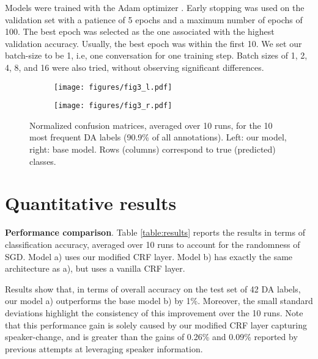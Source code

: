 \documentclass[11pt,a4paper]{article}
\begin{document}
Models were trained with the Adam optimizer \citep{kingma2014adam}.
Early stopping was used on the validation set with a patience of 5 epochs and a maximum number of epochs of 100.
The best epoch was selected as the one associated with the highest validation accuracy. 
Usually, the best epoch was within the first 10.
We set our batch-size to be 1, i.e, one conversation for one training step.
Batch sizes of 1, 2, 4, 8, and 16 were also tried, without observing significant differences.

\begin{figure*}[ht]
\centering
\begin{subfigure}[t]{0.49\textwidth}
\centering
\texttt{[image: figures/fig3\_l.pdf]}
\end{subfigure}
\begin{subfigure}[t]{0.49\textwidth}
\centering
\texttt{[image: figures/fig3\_r.pdf]}
\end{subfigure}
\caption{Normalized confusion matrices, averaged over 10 runs, for the 10 most frequent DA labels (90.9\% of all annotations).
Left: our model, right: base model.
Rows (columns) correspond to true (predicted) classes.}
\label{fig:confusion}
\end{figure*}

\section{Quantitative results}
\noindent \textbf{Performance comparison}. Table \ref{table:results} reports the results in terms of classification accuracy, averaged over 10 runs to account for the randomness of SGD.
Model a) uses our modified CRF layer. Model b) has exactly the same architecture as a), but uses a vanilla CRF layer.

Results show that, in terms of overall accuracy on the test set of 42 DA labels, our model a) outperforms the base model b) by 1\%.
Moreover, the small standard deviations highlight the consistency of this improvement over the 10 runs.
Note that this performance gain is solely caused by our modified CRF layer capturing speaker-change, and is greater than the gains of 0.26\% \citep{liu-etal-2017-using-context} and 0.09\% \citep{bothe-etal-2018-context} reported by previous attempts at leveraging speaker information.
\end{document}
